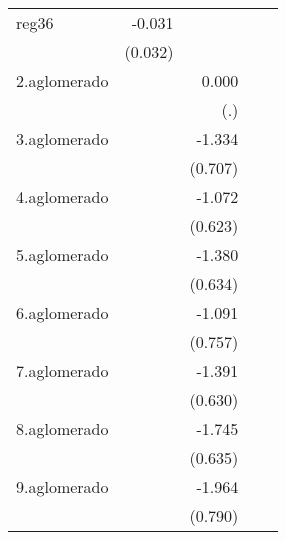 {\begin{longtable}{l*{4}{D{.}{.}{-1}}}
\addlinespace
reg36       &      -0.031         &                     &                     &                     \\
            &     (0.032)         &                     &                     &                     \\
\addlinespace
2.aglomerado&                     &       0.000         &                     &                     \\
            &                     &         (.)         &                     &                     \\
\addlinespace
3.aglomerado&                     &      -1.334         &                     &                     \\
            &                     &     (0.707)         &                     &                     \\
\addlinespace
4.aglomerado&                     &      -1.072         &                     &                     \\
            &                     &     (0.623)         &                     &                     \\
\addlinespace
5.aglomerado&                     &      -1.380\sym{*}  &                     &                     \\
            &                     &     (0.634)         &                     &                     \\
\addlinespace
6.aglomerado&                     &      -1.091         &                     &                     \\
            &                     &     (0.757)         &                     &                     \\
\addlinespace
7.aglomerado&                     &      -1.391\sym{*}  &                     &                     \\
            &                     &     (0.630)         &                     &                     \\
\addlinespace
8.aglomerado&                     &      -1.745\sym{**} &                     &                     \\
            &                     &     (0.635)         &                     &                     \\
\addlinespace
9.aglomerado&                     &      -1.964\sym{*}  &                     &                     \\
            &                     &     (0.790)         &                     &                     \\

\end{longtable}}
